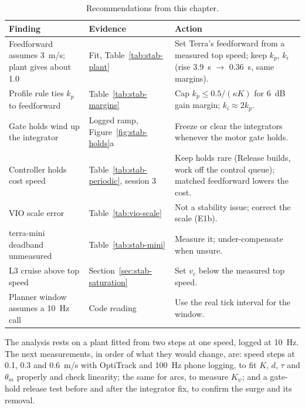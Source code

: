 \begin{table}[ht]
\centering
\caption{Recommendations from this chapter.}
\label{tab:stab-recs}
\small
\begin{tabularx}{\textwidth}{@{}>{\raggedright\arraybackslash}p{} >{\raggedright\arraybackslash}p{} X@{}}
\toprule
Finding & Evidence & Action \\
\midrule
Feedforward assumes 3~m/s; plant gives about 1.0 & Fit, Table~\ref{tab:stab-plant} & Set Terra's feedforward from a measured top speed; keep $k_p$, $k_i$ (rise 3.9~s $\to$ 0.36~s, same margins). \\
Profile rule ties $k_p$ to feedforward & Table~\ref{tab:stab-margins} & Cap $k_p \le 0.5/(\kappa K)$ for 6~dB gain margin; $k_i \approx 2k_p$. \\
Gate holds wind up the integrator & Logged ramp, Figure~\ref{fig:stab-holds}a & Freeze or clear the integrators whenever the motor gate holds. \\
Controller holds cost speed & Table~\ref{tab:stab-periodic}, session 3 & Keep holds rare (Release builds, work off the control queue); matched feedforward lowers the cost. \\
VIO scale error & Table~\ref{tab:vio-scale} & Not a stability issue; correct the scale (E1b). \\
terra-mini deadband unmeasured & Table~\ref{tab:stab-mini} & Measure it; under-compensate when unsure. \\
L3 cruise above top speed & Section~\ref{sec:stab-saturation} & Set $v_c$ below the measured top speed. \\
Planner window assumes a 10~Hz call & Code reading & Use the real tick interval for the window. \\
\bottomrule
\end{tabularx}
\end{table}

The analysis rests on a plant fitted from two steps at one speed, logged at 10~Hz.
The next measurements, in order of what they would change, are: speed steps at 0.1, 0.3 and 0.6~m/s with OptiTrack and 100~Hz phone logging, to fit $K$, $d$, $\tau$ and $\theta_m$ properly and check linearity; the same for arcs, to measure $K_\psi$; and a gate-hold release test before and after the integrator fix, to confirm the surge and its removal.
